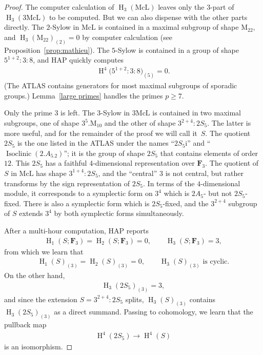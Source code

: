 \documentclass[pdftex]{sigma}
\numberwithin{equation}{section}
\newcommand\bF{\mathbf F}
\newcommand\rM{\mathrm M}
\DeclareMathOperator\homology{H}
\renewcommand\H{\homology}
\newcommand\<\langle
\renewcommand\>\rangle
\begin{document}
\begin{proof}
 The computer calculation of $ \H_3(\mathrm{McL})$ leaves only the $3$-part of $\H_3(3\mathrm{McL})$ to be computed. But we can also dispense with the other parts directly.
 The $2$-Sylow in $\mathrm{McL}$ is contained in a maximal subgroup of shape $\rM_{22}$, and $\H_3(\rM_{22})_{(2)} = 0$ by computer calculation (see Proposition~\ref{prop:mathieu}). The $5$-Sylow is contained in a group of shape $5^{1+2}:3:8$, and HAP quickly computes \begin{gather*}\H^4\big(5^{1+2}:3:8\big)_{(5)} = 0.\end{gather*} (The ATLAS contains generators for most maximal subgroups of sporadic groups.)
 Lemma~\ref{large primes} handles the primes $p\geq 7$.

 Only the prime $3$ is left. The $3$-Sylow in $3\mathrm{McL}$ is contained in two maximal subgroups, one of shape $3^5.\rM_{10}$ and the other of shape $3^{2+4}:2S_5$.
 The latter is more useful, and for the remainder of the proof we will call it~$S$.
 The quotient $2S_5$ is the one listed in the ATLAS under the names ``$2S_5\mathrm{i}$'' and ``$\operatorname{Isoclinic}(2.A_5.2)$''; it is the group of shape $2S_5$ that contains elements of order $12$. This $2S_5$ has a faithful 4-dimensional representation over $\bF_3$. The quotient of $S$ in $\mathrm{McL}$ has shape $3^{1+4}:2S_5$, and the ``central'' $3$ is not central, but rather transforms by the sign representation of $2S_5$. In terms of the $4$-dimensional module, it corresponds to a symplectic form on $3^4$ which is $2A_5$- but not $2S_5$-fixed. There is also a symplectic form which is $2S_5$-fixed, and the $3^{2+4}$ subgroup of $S$ extends $3^4$ by both symplectic forms simultaneously.

 After a multi-hour computation, HAP reports
 \begin{gather*} \H_1(S; \bF_3) = \H_2(S; \bF_3) = 0, \qquad \H_3(S; \bF_3) = 3, \end{gather*}
 from which we learn that
 \begin{gather*} \H_1(S)_{(3)} = \H_2(S)_{(3)} = 0, \qquad \H_3(S)_{(3)} \text{ is cyclic.} \end{gather*}
 On the other hand,
 \begin{gather*} \H_3(2S_5)_{(3)} = 3, \end{gather*}
 and since the extension $S = 3^{2+4}:2S_5$ splits, $\H_3(S)_{(3)}$ contains $\H_3(2S_5)_{(3)}$ as a direct summand. Passing to cohomology, we learn that the pullback map
 \begin{gather*} \H^4(2S_5) \to \H^4(S) \end{gather*}
 is an isomorphism.


\end{proof}
\end{document}
